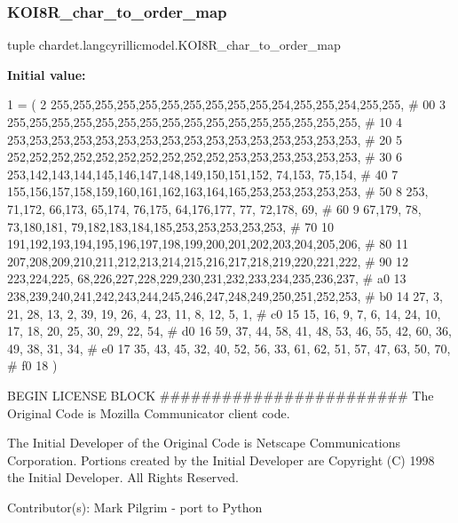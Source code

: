 \subsubsection{\texorpdfstring{K\+O\+I8\+R\+\_\+char\+\_\+to\+\_\+order\+\_\+map}{KOI8R\_char\_to\_order\_map}}
{\footnotesize\ttfamily tuple chardet.\+langcyrillicmodel.\+K\+O\+I8\+R\+\_\+char\+\_\+to\+\_\+order\+\_\+map}

{\bfseries Initial value\+:}
\begin{DoxyCode}
1 =  (
2 255,255,255,255,255,255,255,255,255,255,254,255,255,254,255,255,  \textcolor{comment}{# 00}
3 255,255,255,255,255,255,255,255,255,255,255,255,255,255,255,255,  \textcolor{comment}{# 10}
4 253,253,253,253,253,253,253,253,253,253,253,253,253,253,253,253,  \textcolor{comment}{# 20}
5 252,252,252,252,252,252,252,252,252,252,253,253,253,253,253,253,  \textcolor{comment}{# 30}
6 253,142,143,144,145,146,147,148,149,150,151,152, 74,153, 75,154,  \textcolor{comment}{# 40}
7 155,156,157,158,159,160,161,162,163,164,165,253,253,253,253,253,  \textcolor{comment}{# 50}
8 253, 71,172, 66,173, 65,174, 76,175, 64,176,177, 77, 72,178, 69,  \textcolor{comment}{# 60}
9  67,179, 78, 73,180,181, 79,182,183,184,185,253,253,253,253,253,  \textcolor{comment}{# 70}
10 191,192,193,194,195,196,197,198,199,200,201,202,203,204,205,206,  \textcolor{comment}{# 80}
11 207,208,209,210,211,212,213,214,215,216,217,218,219,220,221,222,  \textcolor{comment}{# 90}
12 223,224,225, 68,226,227,228,229,230,231,232,233,234,235,236,237,  \textcolor{comment}{# a0}
13 238,239,240,241,242,243,244,245,246,247,248,249,250,251,252,253,  \textcolor{comment}{# b0}
14  27,  3, 21, 28, 13,  2, 39, 19, 26,  4, 23, 11,  8, 12,  5,  1,  \textcolor{comment}{# c0}
15  15, 16,  9,  7,  6, 14, 24, 10, 17, 18, 20, 25, 30, 29, 22, 54,  \textcolor{comment}{# d0}
16  59, 37, 44, 58, 41, 48, 53, 46, 55, 42, 60, 36, 49, 38, 31, 34,  \textcolor{comment}{# e0}
17  35, 43, 45, 32, 40, 52, 56, 33, 61, 62, 51, 57, 47, 63, 50, 70,  \textcolor{comment}{# f0}
18 )
\end{DoxyCode}


B\+E\+G\+IN L\+I\+C\+E\+N\+SE B\+L\+O\+CK \#\#\#\#\#\#\#\#\#\#\#\#\#\#\#\#\#\#\#\#\#\#\#\# The Original Code is Mozilla Communicator client code. 

The Initial Developer of the Original Code is Netscape Communications Corporation. Portions created by the Initial Developer are Copyright (C) 1998 the Initial Developer. All Rights Reserved.

Contributor(s)\+: Mark Pilgrim -\/ port to Python

